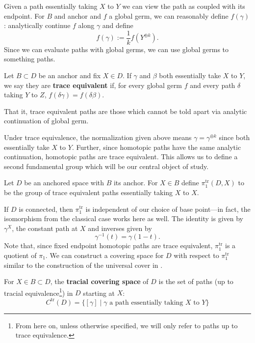 Given a path essentially taking \(X\) to \(Y\) we can view the path as coupled
with its endpoint. For \(B\) and anchor and \(f\) a global germ, we can
reasonably define \(f(\gamma)\): analytically continue \(f\) along \(\gamma\) and define
\[
  f(\gamma) := \frac{1}{k} f(Y^{\oplus k}).
\]
Since we can evaluate paths with global germs, we can use global germs to
{\color{green} something} paths.

\begin{definition}
\label{def:label}
  Let \(B \subset D\) be an anchor and fix \(X \in D\). If \(\gamma\) and
  \(\beta\) both essentially take \(X\) to \(Y\), we say they are
  \textbf{trace equivalent} if, for every global germ \(f\) and every path
  \(\delta\) taking \(Y\) to \(Z\), \(f(\delta\gamma)=f(\delta\beta)\).

  That it, trace equivalent paths are those which cannot be told apart via
  analytic continuation of global germ.
\end{definition}

Under trace equivalence, the normalization given above means
\(\gamma = \gamma^{\oplus k}\) since both essentially take \(X\) to \(Y\).
Further, since homotopic paths have the same analytic continuation, homotopic
paths are trace equivalent. This allows us to define a second fundamental group
which will be our central object of study.
\begin{definition}%
\label{def:trpi1}
 Let \(D\) be an anchored space with \(B\) its anchor. For \(X \in B\) define
 \(\pi_1^{\textrm{tr}}(D,X)\) to be the group of trace equivalent paths
 essentially taking \(X\) to \(X\).
\end{definition}
If \(D\) is connected, then \(\pi_1^{\textrm{tr}}\) is independent of our
choice of base point---in fact, the isomorphism from the classical case
{\color{green} works here as well}. The identity is given by \(\gamma^X\), the
constant path at \(X\) and inverses given by
\[
  \gamma ^{-1}(t) = \gamma (1-t).
\]
Note that, since fixed endpoint homotopic paths are trace equivalent,
\(\pi_1^{\textrm{tr}}\) is a quotient of \(\pi_1\). We can construct a covering
space for \(D\) with respect to \(\pi_1^{\textrm{tr}}\) similar to the
construction of the universal cover in \cite{hatcherAlgebraic2002}.

\begin{definition}%
\label{def:trcover}
  For \(X \in B \subset D\), the \textbf{tracial covering space} of \(D\) is the
  set of paths {(up to tracial equivalence\footnote{From here on, unless otherwise specified, we will only refer to
    paths up to trace equivalence.})}
  in \(D\) starting at \(X\):
  \[
    C^{\textrm{tr}}(D) = \{[\gamma] \mid \gamma \text{ a path essentially taking
    \(X\) to \(Y\)}\}
  \]
\end{definition}

